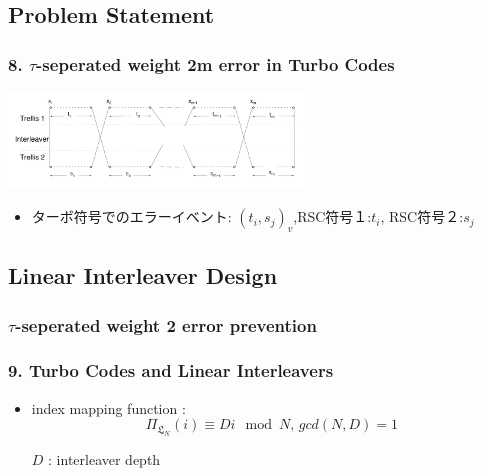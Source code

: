 \documentclass{beamer}  %
\begin{document}
\subsection{Problem Statement}
\begin{frame}
\frametitle{8. $\tau$-seperated weight 2m error in Turbo Codes}



\begin{center}
\includegraphics[width=8cm]{weight2m.pdf}
\end{center}




\begin{itemize}
\item  ターボ符号でのエラーイベント: $(t_i,s_j)_v$,RSC符号１:$t_i$, RSC符号２:$s_j$
\end{itemize}


\end{frame}

\subsection{Linear Interleaver Design}
\subsubsection{$\tau$-seperated weight 2 error prevention }
\begin{frame}
\frametitle{9.  Turbo Codes and Linear Interleavers }


\begin{itemize}
\item  index mapping function :
\begin{equation}
 \Pi_{\mathfrak{L}_N}(i) \equiv Di \mod N , \, gcd(N,D)=1
\end{equation}
\begin{centering}
 $D$ : interleaver depth
\end{centering}


\end{itemize}
\end{frame}
\end{document}
